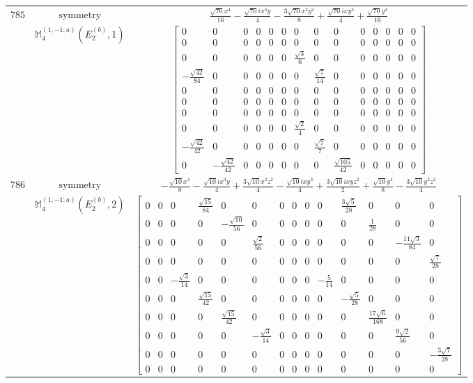 \documentclass[fleqn,8pt,landscape]{jsarticle}
\begin{document}
\begin{longtable}{ccc}
$ 785 $ & $ \text{symmetry} $ & $ \frac{\sqrt{70} x^{4}}{16} - \frac{\sqrt{70} i x^{3} y}{4} - \frac{3 \sqrt{70} x^{2} y^{2}}{8} + \frac{\sqrt{70} i x y^{3}}{4} + \frac{\sqrt{70} y^{4}}{16} $ \\
$  $ & $ \mathbb{M}_{4}^{(1,-1;a)}(E_{2}^{(b)},1) $ & $ \begin{bmatrix} 0 & 0 & 0 & 0 & 0 & 0 & 0 & 0 & 0 & 0 & 0 & 0 & 0 & 0 \\ 0 & 0 & 0 & 0 & 0 & 0 & 0 & 0 & 0 & 0 & 0 & 0 & 0 & 0 \\ 0 & 0 & 0 & 0 & 0 & 0 & \frac{\sqrt{3}}{6} & 0 & 0 & 0 & 0 & 0 & 0 & 0 \\ - \frac{\sqrt{42}}{84} & 0 & 0 & 0 & 0 & 0 & 0 & \frac{\sqrt{7}}{14} & 0 & 0 & 0 & 0 & 0 & 0 \\ 0 & 0 & 0 & 0 & 0 & 0 & 0 & 0 & 0 & 0 & 0 & 0 & 0 & 0 \\ 0 & 0 & 0 & 0 & 0 & 0 & 0 & 0 & 0 & 0 & 0 & 0 & 0 & 0 \\ 0 & 0 & 0 & 0 & 0 & 0 & 0 & 0 & 0 & 0 & 0 & 0 & 0 & 0 \\ 0 & 0 & 0 & 0 & 0 & 0 & \frac{\sqrt{2}}{4} & 0 & 0 & 0 & 0 & 0 & 0 & 0 \\ - \frac{\sqrt{42}}{42} & 0 & 0 & 0 & 0 & 0 & 0 & \frac{\sqrt{7}}{7} & 0 & 0 & 0 & 0 & 0 & 0 \\ 0 & - \frac{\sqrt{42}}{42} & 0 & 0 & 0 & 0 & 0 & 0 & \frac{\sqrt{105}}{42} & 0 & 0 & 0 & 0 & 0 \end{bmatrix} $ \\ \hline
$ 786 $ & $ \text{symmetry} $ & $ - \frac{\sqrt{10} x^{4}}{8} - \frac{\sqrt{10} i x^{3} y}{4} + \frac{3 \sqrt{10} x^{2} z^{2}}{4} - \frac{\sqrt{10} i x y^{3}}{4} + \frac{3 \sqrt{10} i x y z^{2}}{2} + \frac{\sqrt{10} y^{4}}{8} - \frac{3 \sqrt{10} y^{2} z^{2}}{4} $ \\
$  $ & $ \mathbb{M}_{4}^{(1,-1;a)}(E_{2}^{(b)},2) $ & $ \begin{bmatrix} 0 & 0 & 0 & \frac{\sqrt{15}}{84} & 0 & 0 & 0 & 0 & 0 & 0 & \frac{3 \sqrt{5}}{28} & 0 & 0 & 0 \\ 0 & 0 & 0 & 0 & - \frac{\sqrt{10}}{56} & 0 & 0 & 0 & 0 & 0 & 0 & \frac{1}{28} & 0 & 0 \\ 0 & 0 & 0 & 0 & 0 & \frac{\sqrt{2}}{56} & 0 & 0 & 0 & 0 & 0 & 0 & - \frac{11 \sqrt{3}}{84} & 0 \\ 0 & 0 & 0 & 0 & 0 & 0 & 0 & 0 & 0 & 0 & 0 & 0 & 0 & \frac{\sqrt{7}}{28} \\ 0 & 0 & - \frac{\sqrt{3}}{14} & 0 & 0 & 0 & 0 & 0 & 0 & - \frac{5}{14} & 0 & 0 & 0 & 0 \\ 0 & 0 & 0 & \frac{\sqrt{15}}{42} & 0 & 0 & 0 & 0 & 0 & 0 & - \frac{\sqrt{5}}{28} & 0 & 0 & 0 \\ 0 & 0 & 0 & 0 & \frac{\sqrt{15}}{42} & 0 & 0 & 0 & 0 & 0 & 0 & \frac{17 \sqrt{6}}{168} & 0 & 0 \\ 0 & 0 & 0 & 0 & 0 & - \frac{\sqrt{3}}{14} & 0 & 0 & 0 & 0 & 0 & 0 & \frac{9 \sqrt{2}}{56} & 0 \\ 0 & 0 & 0 & 0 & 0 & 0 & 0 & 0 & 0 & 0 & 0 & 0 & 0 & - \frac{3 \sqrt{7}}{28} \\ 0 & 0 & 0 & 0 & 0 & 0 & 0 & 0 & 0 & 0 & 0 & 0 & 0 & 0 \end{bmatrix} $ \\ \hline

\end{longtable}
\end{document}

